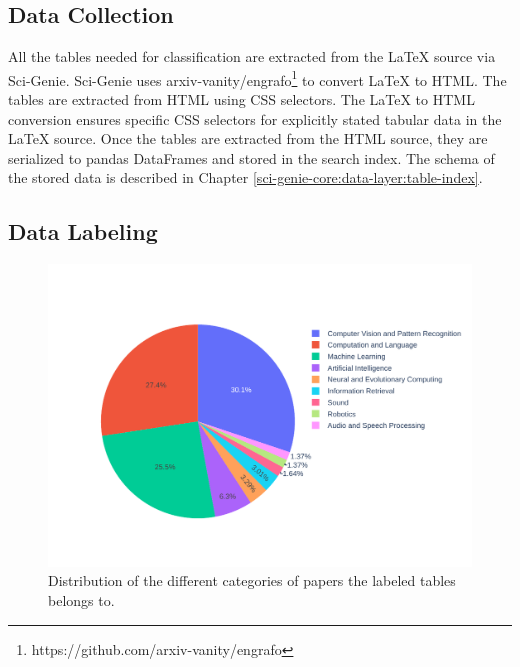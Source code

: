 \subsection{Data Collection}
\label{table_classification:data-coll:coll}
All the tables needed for classification are extracted from the LaTeX source via Sci-Genie. Sci-Genie uses arxiv-vanity/engrafo\footnote{https://github.com/arxiv-vanity/engrafo} to convert LaTeX to HTML. The tables are extracted from HTML using CSS selectors. The LaTeX to HTML conversion ensures specific CSS selectors for explicitly stated tabular data in the LaTeX source. Once the tables are extracted from the HTML source, they are serialized to pandas DataFrames and stored in the search index. The schema of the stored data is described in Chapter \ref{sci-genie-core:data-layer:table-index}. 

\subsection{Data Labeling}
\label{table_classification:data-coll:lab}
\begin{figure}[h]
    \centering
    \includegraphics[width=\maxwidth{\textwidth}]{src/images/labeled_data_distribution.pdf}
    \caption{Distribution of the different categories of papers the labeled tables belongs to.}
    \label{figure\arabic{figurecounter}}
\end{figure}

